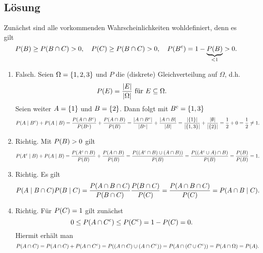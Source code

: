 \documentclass{exercise}
\begin{document}
    \subsection*{Lösung}
    Zunächst sind alle vorkommenden Wahrscheinlichkeiten wohldefiniert, denn es gilt
    \[
        P\parentheses*{B} \ge P\parentheses*{B \cap C} > 0, \quad P\parentheses*{C} \ge P\parentheses*{B \cap C} > 0, \quad P\parentheses*{B^c}= 1 - \underbrace{P\parentheses*{B}}_{< 1} > 0.
    \]
    \begin{enumerate}
        \item Falsch.
        Seien \(\Omega = \braces*{1, 2, 3}\) und \(P\) die (diskrete) Gleichverteilung auf \(\Omega\), d.h.
        \[
            P\parentheses*{E} = \frac{\absolute*{E}}{\absolute*{\Omega}}\text{ für }E \subseteq \Omega.
        \]
        Seien weiter \(A = \braces*{1}\) und \(B = \braces*{2}\).
        Dann folgt mit \(B^c = \braces*{1, 3}\)
        \[
            P\parentheses*{A \mid B^c} + P\parentheses*{A \mid B} = \frac{P\parentheses*{A \cap B^c}}{P\parentheses*{B^c}} + \frac{P\parentheses*{A \cap B}}{P\parentheses*{B}} = \frac{\absolute*{A \cap B^c}}{\absolute*{B^c}} + \frac{\absolute*{A \cap B}}{\absolute*{B}} = \frac{\absolute*{\braces*{1}}}{\absolute*{\braces*{1, 3}}} + \frac{\absolute*{\emptyset}}{\absolute*{\braces*{2}}} = \frac{1}{2} + 0 = \frac{1}{2} \ne 1.
        \]
        \item Richtig.
        Mit \(P\parentheses*{B} > 0\) gilt
        \[
            P\parentheses*{A^c \mid B} + P\parentheses*{A \mid B} = \frac{P\parentheses*{A^c \cap B}}{P\parentheses*{B}} + \frac{P\parentheses*{A \cap B}}{P\parentheses*{B}} = \frac{P\parentheses*{\parentheses*{A^c \cap B} \cup \parentheses*{A \cap B}}}{P\parentheses*{B}} = \frac{P\parentheses*{\parentheses*{A^c \cup A} \cap B}}{P\parentheses*{B}} = \frac{P\parentheses*{B}}{P\parentheses*{B}} = 1.
        \]
        \item Richtig.
        Es gilt
        \[
            P\parentheses*{A \mid B \cap C}P\parentheses*{B \mid C} = \frac{P\parentheses*{A \cap B \cap C}}{P\parentheses*{B \cap C}}\frac{P\parentheses*{B \cap C}}{P\parentheses*{C}} = \frac{P\parentheses*{A \cap B \cap C}}{P\parentheses*{C}} = P\parentheses*{A \cap B \mid C}.
        \]
        \item Richtig.
        Für \(P\parentheses*{C} = 1\) gilt zunächst
        \[
            0 \le P\parentheses*{A \cap C^c} \le P\parentheses*{C^c} = 1 - P\parentheses*{C} = 0.
        \]
        Hiermit erhält man
        \[
            P\parentheses*{A \cap C} = P\parentheses*{A \cap C} + P\parentheses*{A \cap C^c} = P\parentheses*{\parentheses*{A \cap C} \cup \parentheses*{A \cap C^c}} = P\parentheses*{A \cap \parentheses*{C \cup C^c}} = P\parentheses*{A \cap \Omega} = P\parentheses*{A}.
\]
\end{enumerate}
\end{document}

